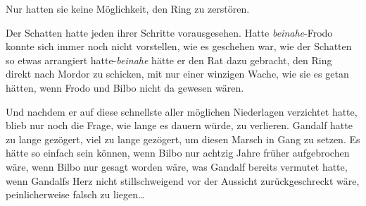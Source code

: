 Nur hatten sie keine Möglichkeit, den Ring zu zerstören.

Der Schatten hatte jeden ihrer Schritte vorausgesehen. Hatte \emph{beinahe}-Frodo konnte sich immer noch nicht vorstellen, wie es geschehen war, wie der Schatten so etwas arrangiert hatte-\emph{beinahe} hätte er den Rat dazu gebracht, den Ring direkt nach Mordor zu schicken, mit nur einer winzigen Wache, wie sie es getan hätten, wenn Frodo und Bilbo nicht da gewesen wären.

Und nachdem er auf diese schnellste aller möglichen Niederlagen verzichtet hatte, blieb nur noch die Frage, wie lange es dauern würde, zu verlieren. Gandalf hatte zu lange gezögert, viel zu lange gezögert, um diesen Marsch in Gang zu setzen. Es hätte so einfach sein können, wenn Bilbo nur achtzig Jahre früher aufgebrochen wäre, wenn Bilbo nur gesagt worden wäre, was Gandalf bereits vermutet hatte, wenn Gandalfs Herz nicht stillschweigend vor der Aussicht zurückgeschreckt wäre, peinlicherweise falsch zu liegen…

